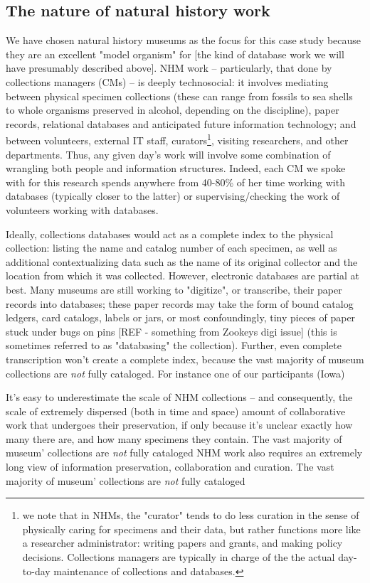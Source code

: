 \subsection{The nature of natural history work}

We have chosen natural history museums as the focus for this case study because they are an excellent "model organism" for [the kind of database work we will have presumably described above]. NHM work -- particularly, that done by collections managers (CMs) -- is deeply technosocial: it involves mediating between physical specimen collections (these can range from fossils to sea shells to whole organisms preserved in alcohol, depending on the discipline), paper records, relational databases and anticipated future information technology; and between volunteers, external IT staff, curators\footnote{we note that in NHMs, the "curator" tends to do less curation in the sense of physically caring for specimens and their data, but rather functions more like a researcher administrator: writing papers and grants, and making policy decisions. Collections managers are typically in charge of the the actual day-to-day maintenance of collections and databases.}, visiting researchers, and other departments. Thus, any given day’s work will involve some combination of wrangling both people and information structures. Indeed, each CM we spoke with for this research spends anywhere from 40-80\% of her time working with databases (typically closer to the latter) or supervising/checking the work of volunteers working with databases.

Ideally, collections databases would act as a complete index to the physical collection: listing the name and catalog number of each specimen, as well as additional contextualizing data such as the name of its original collector and the location from which it was collected. However, electronic databases are partial at best. Many museums are still working to "digitize", or transcribe, their paper records into databases; these paper records may take the form of bound catalog ledgers, card catalogs, labels or jars, or most confoundingly, tiny pieces of paper stuck under bugs on pins [REF - something from Zookeys digi issue] (this is sometimes referred to as "databasing" the collection). Further, even complete transcription won't create a complete index, because the vast majority of museum collections are \textit{not} fully cataloged. For instance one of our participants (Iowa)

It's easy to underestimate the scale of NHM collections -- and consequently, the scale of extremely dispersed (both in time and space) amount of collaborative work that undergoes their preservation, if only because it's unclear exactly how many there are, and how many specimens they contain. The vast majority of museum' collections are \textit{not} fully cataloged 
NHM work also requires an extremely long view of information preservation, collaboration and curation. The vast majority of museum' collections are \textit{not} fully cataloged 

